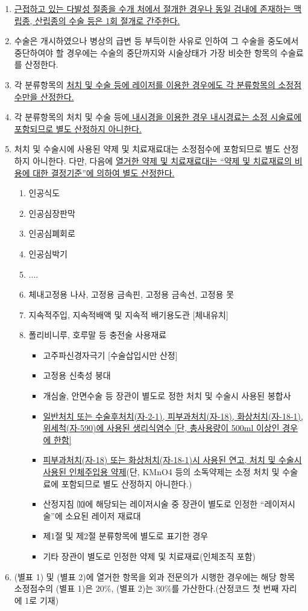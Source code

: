 \begin{enumerate}[(1)]
\item \uline{근접하고 있는 다발성 절종을 수개 처에서 절개한 경우나 동일 검내에 존재하는 맥립종, 산립종의 수술 등은 1회 절개로 간주한다.}
\item 수술은 개시하였으나 병상의 급변 등 부득이한 사유로 인하여 그 수술을 중도에서 중단하여야 할 경우에는 수술의 중단까지와 시술상태가 가장 비슷한 항목의 수술료를 산정한다.
\item 각 분류항목의 \uline{처치 및 수술 등에 레이저를 이용한 경우에도 각 분류항목의 소정점수만을 산정한다.}
\item 각 분류항목의 처치 및 수술 등에\uline{ 내시경을 이용한 경우 내시경료는 소정 시술료에 포함되므로 별도 산정하지 아니한다.}
\item 처치 및 수술시에 사용된 약제 및 치료재료대는 소정점수에 포함되므로 별도 산정하지 아니한다. 다만, 다음에 \uline{열거한 약제 및 치료재료대는 “약제 및 치료재료의 비용에 대한 결정기준”에 의하여 별도 산정한다.}
	\begin{enumerate}[①]\tightlist
	\item 인공식도
	\item 인공심장판막
	\item 인공심폐회로
	\item 인공심박기
	\item ....
	\item 체내고정용 나사, 고정용 금속핀, 고정용 금속선, 고정용 못
	\item 지속적주입, 지속적배액 및 지속적 배기용도관 [체내유치]
	\item 폴리비니루, 호루말 등 충전술 사용재료
		\begin{itemize}\tightlist
		\item 고주파신경자극기 [수술삽입시만 산정]
		\item 고정용 신축성 붕대
		\item 개심술, 안면수술 등 장관이 별도로 정한 처치 및 수술시 사용된 봉합사
		\item \uline{일반처치 또는 수술후처치(자-2-1), 피부과처치(자-18), 화상처치(자-18-1),위세척(자-590)에 사용된 생리식염수 [단, 총사용량이 500ml 이상인 경우에 한함] }
		\item \uline{피부과처치(자-18) 또는 화상처치(자-18-1)시 사용된 연고, 처치 및 수술시 사용된 인체주입용 약제}(단, KMnO4 등의 소독약제는 소정 처치 및 수술료에 포함되므로 별도 산정하지 아니한다.)
		\item 산정지침 ⑽에 해당되는 레이저시술 중 장관이 별도로 인정한 “레이저시술”에 소요된 레이저 재료대
		\item 제1절 및 제2절 분류항목에 별도로 표기한 경우
		\item 기타 장관이 별도로 인정한 약제 및 치료재료(인체조직 포함)
  		\end{itemize}
	\end{enumerate}  
\item (별표 1) 및 (별표 2)에 열거한 항목을 외과 전문의가 시행한 경우에는 해당 항목 소정점수의 (별표 1)은 20\%, (별표 2)는 30\%를 가산한다.(산정코드 첫 번째 자리에 1로 기재)
\end{enumerate}

